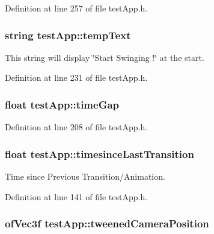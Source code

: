 Definition at line 257 of file test\-App.\-h.

\hypertarget{classtest_app_ad9a4beab6f2e0f13d32b00b502e89bdc}{
\subsubsection[{temp\-Text}]{\setlength{\rightskip}{0pt plus 5cm}string test\-App\-::temp\-Text}}\label{classtest_app_ad9a4beab6f2e0f13d32b00b502e89bdc}


This string will display \char`\"{}\-Start Swinging !\char`\"{} at the start. 



Definition at line 231 of file test\-App.\-h.

\hypertarget{classtest_app_a944f2713019239a4b49241a5cc9a00c9}{
\subsubsection[{time\-Gap}]{\setlength{\rightskip}{0pt plus 5cm}float test\-App\-::time\-Gap}}\label{classtest_app_a944f2713019239a4b49241a5cc9a00c9}


Definition at line 208 of file test\-App.\-h.

\hypertarget{classtest_app_acb60fb8a89e9ec5d461630a20b11ceda}{
\subsubsection[{timesince\-Last\-Transition}]{\setlength{\rightskip}{0pt plus 5cm}float test\-App\-::timesince\-Last\-Transition}}\label{classtest_app_acb60fb8a89e9ec5d461630a20b11ceda}


Time since Previous Transition/\-Animation. 



Definition at line 141 of file test\-App.\-h.

\hypertarget{classtest_app_ae9f60797c1c5d9f1ac06e1d6a5259957}{
\subsubsection[{tweened\-Camera\-Position}]{\setlength{\rightskip}{0pt plus 5cm}of\-Vec3f test\-App\-::tweened\-Camera\-Position}}\label{classtest_app_ae9f60797c1c5d9f1ac06e1d6a5259957}


